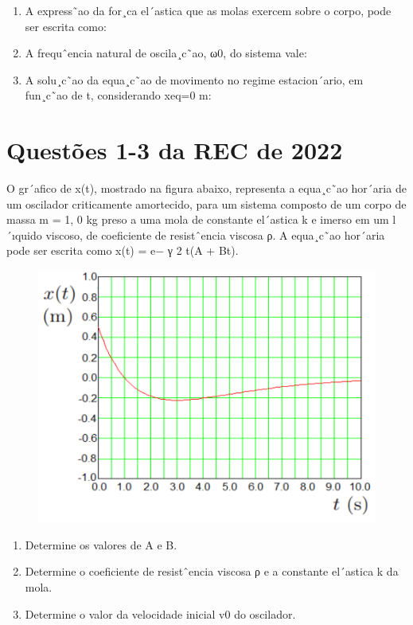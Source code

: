 \documentclass[a4paper,12pt]{article}
\begin{document}
\begin{enumerate}
\item A express˜ao da for¸ca el´astica que as molas exercem sobre o corpo, pode ser escrita
como:

\item A frequˆencia natural de oscila¸c˜ao, ω0, do sistema vale:

\item A solu¸c˜ao da equa¸c˜ao de movimento no regime estacion´ario, em fun¸c˜ao de t,
considerando xeq=0 m:
\end{enumerate}


\section{Questões 1-3 da REC de 2022}

O gr´afico de x(t), mostrado na figura abaixo, representa a equa¸c˜ao
hor´aria de um oscilador criticamente amortecido, para um sistema composto de um corpo de massa
m = 1, 0 kg preso a uma mola de constante el´astica k e imerso em um l´ıquido viscoso, de coeficiente
de resistˆencia viscosa ρ. A equa¸c˜ao hor´aria pode ser escrita como x(t) = e− γ
2 t(A + Bt).
\begin{figure}[H]
\centering
\includegraphics[width=0.6\linewidth]{fig/grafico_rec.png}
\label{fig:grafico_rec}
\end{figure}

\begin{enumerate}
\item Determine os valores de A e B.

\item Determine o coeficiente de resistˆencia viscosa ρ e a constante el´astica k da mola.

\item Determine o valor da velocidade inicial v0 do oscilador.
\end{enumerate}
\end{document}
